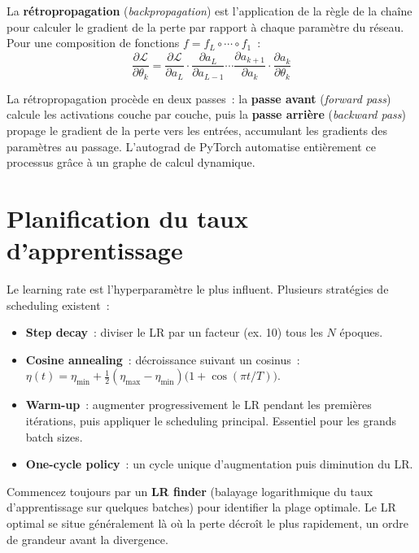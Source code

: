 \documentclass[a4paper,11pt,twoside]{book}
\begin{document}
La \textbf{rétropropagation} (\textit{backpropagation}) est l'application de la règle de la chaîne pour calculer le gradient de la perte par rapport à chaque paramètre du réseau. Pour une composition de fonctions $f = f_L \circ \cdots \circ f_1$~:
\[
\frac{\partial \mathcal{L}}{\partial \theta_k} = \frac{\partial \mathcal{L}}{\partial a_L} \cdot \frac{\partial a_L}{\partial a_{L-1}} \cdots \frac{\partial a_{k+1}}{\partial a_k} \cdot \frac{\partial a_k}{\partial \theta_k}
\]

La rétropropagation procède en deux passes~: la \textbf{passe avant} (\textit{forward pass}) calcule les activations couche par couche, puis la \textbf{passe arrière} (\textit{backward pass}) propage le gradient de la perte vers les entrées, accumulant les gradients des paramètres au passage. L'autograd de PyTorch automatise entièrement ce processus grâce à un graphe de calcul dynamique.

\section{Planification du taux d'apprentissage}

Le learning rate est l'hyperparamètre le plus influent. Plusieurs stratégies de scheduling existent~:

\begin{itemize}[leftmargin=2em]
  \item \textbf{Step decay}~: diviser le LR par un facteur (ex. 10) tous les $N$ époques.
  \item \textbf{Cosine annealing}~: décroissance suivant un cosinus~: $\eta(t) = \eta_\text{min} + \frac{1}{2}(\eta_\text{max} - \eta_\text{min})\big(1 + \cos(\pi t / T)\big)$.
  \item \textbf{Warm-up}~: augmenter progressivement le LR pendant les premières itérations, puis appliquer le scheduling principal. Essentiel pour les grands batch sizes.
  \item \textbf{One-cycle policy}~: un cycle unique d'augmentation puis diminution du LR.
\end{itemize}

\begin{notebox}
Commencez toujours par un \textbf{LR finder} (balayage logarithmique du taux d'apprentissage sur quelques batches) pour identifier la plage optimale. Le LR optimal se situe généralement là où la perte décroît le plus rapidement, un ordre de grandeur avant la divergence.
\end{notebox}
\end{document}
